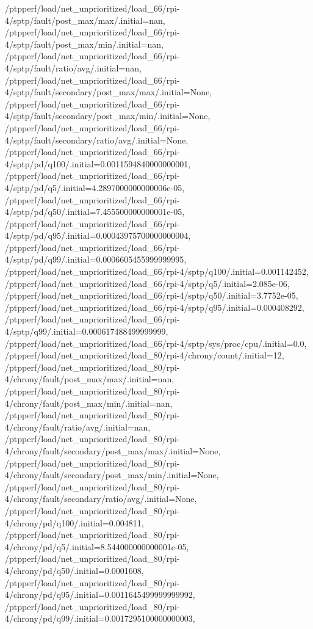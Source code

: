 {    /ptpperf/load/net_unprioritized/load_66/rpi-4/sptp/fault/post_max/max/.initial=nan,
    /ptpperf/load/net_unprioritized/load_66/rpi-4/sptp/fault/post_max/min/.initial=nan,
    /ptpperf/load/net_unprioritized/load_66/rpi-4/sptp/fault/ratio/avg/.initial=nan,
    /ptpperf/load/net_unprioritized/load_66/rpi-4/sptp/fault/secondary/post_max/max/.initial=None,
    /ptpperf/load/net_unprioritized/load_66/rpi-4/sptp/fault/secondary/post_max/min/.initial=None,
    /ptpperf/load/net_unprioritized/load_66/rpi-4/sptp/fault/secondary/ratio/avg/.initial=None,
    /ptpperf/load/net_unprioritized/load_66/rpi-4/sptp/pd/q100/.initial=0.0011594840000000001,
    /ptpperf/load/net_unprioritized/load_66/rpi-4/sptp/pd/q5/.initial=4.2897000000000006e-05,
    /ptpperf/load/net_unprioritized/load_66/rpi-4/sptp/pd/q50/.initial=7.455500000000001e-05,
    /ptpperf/load/net_unprioritized/load_66/rpi-4/sptp/pd/q95/.initial=0.00043975700000000004,
    /ptpperf/load/net_unprioritized/load_66/rpi-4/sptp/pd/q99/.initial=0.0006605455999999995,
    /ptpperf/load/net_unprioritized/load_66/rpi-4/sptp/q100/.initial=0.001142452,
    /ptpperf/load/net_unprioritized/load_66/rpi-4/sptp/q5/.initial=2.085e-06,
    /ptpperf/load/net_unprioritized/load_66/rpi-4/sptp/q50/.initial=3.7752e-05,
    /ptpperf/load/net_unprioritized/load_66/rpi-4/sptp/q95/.initial=0.000408292,
    /ptpperf/load/net_unprioritized/load_66/rpi-4/sptp/q99/.initial=0.000617488499999999,
    /ptpperf/load/net_unprioritized/load_66/rpi-4/sptp/sys/proc/cpu/.initial=0.0,
    /ptpperf/load/net_unprioritized/load_80/rpi-4/chrony/count/.initial=12,
    /ptpperf/load/net_unprioritized/load_80/rpi-4/chrony/fault/post_max/max/.initial=nan,
    /ptpperf/load/net_unprioritized/load_80/rpi-4/chrony/fault/post_max/min/.initial=nan,
    /ptpperf/load/net_unprioritized/load_80/rpi-4/chrony/fault/ratio/avg/.initial=nan,
    /ptpperf/load/net_unprioritized/load_80/rpi-4/chrony/fault/secondary/post_max/max/.initial=None,
    /ptpperf/load/net_unprioritized/load_80/rpi-4/chrony/fault/secondary/post_max/min/.initial=None,
    /ptpperf/load/net_unprioritized/load_80/rpi-4/chrony/fault/secondary/ratio/avg/.initial=None,
    /ptpperf/load/net_unprioritized/load_80/rpi-4/chrony/pd/q100/.initial=0.004811,
    /ptpperf/load/net_unprioritized/load_80/rpi-4/chrony/pd/q5/.initial=8.544000000000001e-05,
    /ptpperf/load/net_unprioritized/load_80/rpi-4/chrony/pd/q50/.initial=0.0001608,
    /ptpperf/load/net_unprioritized/load_80/rpi-4/chrony/pd/q95/.initial=0.0011645499999999992,
    /ptpperf/load/net_unprioritized/load_80/rpi-4/chrony/pd/q99/.initial=0.0017295100000000003,
}
